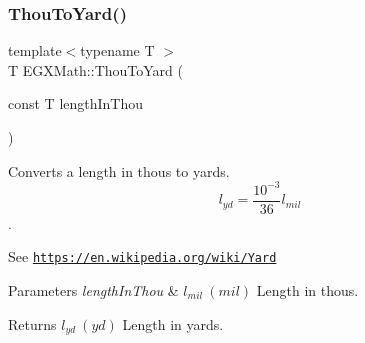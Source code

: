 \subsubsection{\texorpdfstring{Thou\+To\+Yard()}{ThouToYard()}}
{\footnotesize\ttfamily template$<$typename T $>$ \\
T E\+G\+X\+Math\+::\+Thou\+To\+Yard (\begin{DoxyParamCaption}\item[{const T}]{length\+In\+Thou }\end{DoxyParamCaption})}



Converts a length in thous to yards. \[ l_{yd}= \frac{10^{-3}}{36} l_{mil} \]. 

See \href{https://en.wikipedia.org/wiki/Yard}{\tt https\+://en.\+wikipedia.\+org/wiki/\+Yard} 
\begin{DoxyParams}{Parameters}
{\em length\+In\+Thou} & $ l_{mil}\ (mil)$ Length in thous. \\
\hline
\end{DoxyParams}
\begin{DoxyReturn}{Returns}
$ l_{yd}\ (yd)$ Length in yards. 
\end{DoxyReturn}
